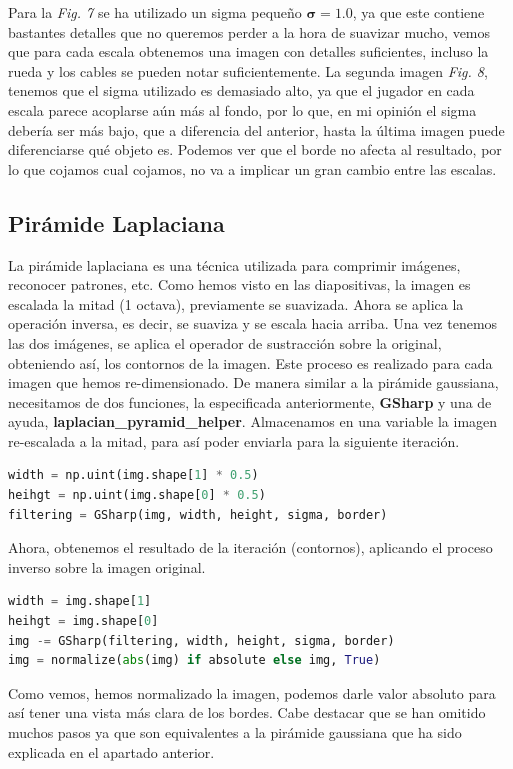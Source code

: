 \documentclass{article}
\begin{document}
Para la \textit{Fig. 7} se ha utilizado un sigma pequeño $\boldsymbol{\sigma} = 1.0$, ya que este contiene bastantes detalles que no queremos perder a la hora de suavizar mucho, vemos que para cada escala obtenemos una imagen con detalles suficientes, incluso la rueda y los cables se pueden notar suficientemente.
\newline
\newline
La segunda imagen \textit{Fig. 8}, tenemos que el sigma utilizado es demasiado alto, ya que el jugador en cada escala parece acoplarse aún más al fondo, por lo que, en mi opinión el sigma debería ser más bajo, que a diferencia del anterior, hasta la última imagen puede diferenciarse qué objeto es.
\newline
\newline
Podemos ver que el borde no afecta al resultado, por lo que cojamos cual cojamos, no va a implicar un gran cambio entre las escalas.

\subsection{Pirámide Laplaciana}
La pirámide laplaciana es una técnica utilizada para comprimir imágenes, reconocer patrones, etc. Como hemos visto en las diapositivas, la imagen es escalada la mitad (1 octava), previamente se suavizada. Ahora se aplica la operación inversa, es decir, se suaviza y se escala hacia arriba. Una vez tenemos las dos imágenes, se aplica el operador de sustracción sobre la original, obteniendo así, los contornos de la imagen. Este proceso es realizado para cada imagen que hemos re-dimensionado.
\newline
\newline
De manera similar a la pirámide gaussiana, necesitamos de dos funciones, la especificada anteriormente, \textbf{GSharp} y una de ayuda, \textbf{laplacian\_pyramid\_helper}. 
Almacenamos en una variable la imagen re-escalada a la mitad, para así poder enviarla para la siguiente iteración.
\begin{lstlisting}[language=Python]
width = np.uint(img.shape[1] * 0.5)
heihgt = np.uint(img.shape[0] * 0.5)
filtering = GSharp(img, width, height, sigma, border)
\end{lstlisting}
Ahora, obtenemos el resultado de la iteración (contornos), aplicando el proceso inverso sobre la imagen original.
\begin{lstlisting}[language=Python]
width = img.shape[1]
heihgt = img.shape[0]
img -= GSharp(filtering, width, height, sigma, border)
img = normalize(abs(img) if absolute else img, True)
\end{lstlisting}
Como vemos, hemos normalizado la imagen, podemos darle valor absoluto para así tener una vista más clara de los bordes.
\newline
\newline
Cabe destacar que se han omitido muchos pasos ya que son equivalentes a la pirámide gaussiana que ha sido explicada en el apartado anterior.
\end{document}

